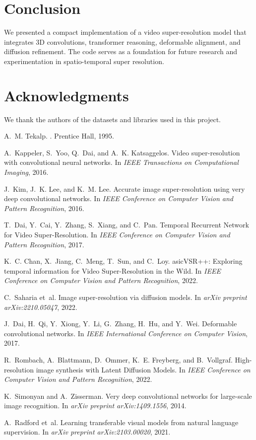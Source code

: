 \documentclass{article}
\begin{document}
\section{Conclusion}
We presented a compact implementation of a video super-resolution model that integrates 3D convolutions, transformer reasoning, deformable alignment, and diffusion refinement. The code serves as a foundation for future research and experimentation in spatio-temporal super resolution.

\section*{Acknowledgments}
We thank the authors of the datasets and libraries used in this project.

\begin{thebibliography}{9}
A.~M. Tekalp.
.
\newblock Prentice Hall, 1995.

A.~Kappeler, S.~Yoo, Q.~Dai, and A.~K. Katsaggelos.
\newblock Video super-resolution with convolutional neural networks.
\newblock In {\em IEEE Transactions on Computational Imaging}, 2016.

J.~Kim, J.~K. Lee, and K.~M. Lee.
\newblock Accurate image super-resolution using very deep convolutional networks.
\newblock In {\em IEEE Conference on Computer Vision and Pattern Recognition}, 2016.

T.~Dai, Y.~Cai, Y.~Zhang, S.~Xiang, and C.~Pan.
\newblock Temporal {R}ecurrent {N}etwork for {V}ideo {S}uper-{R}esolution.
\newblock In {\em IEEE Conference on Computer Vision and Pattern Recognition}, 2017.

K.~C. Chan, X.~Jiang, C.~Meng, T.~Sun, and C.~Loy.
asic{VSR}++: {E}xploring temporal information for {V}ideo {S}uper-{R}esolution in the {W}ild.
\newblock In {\em IEEE Conference on Computer Vision and Pattern Recognition}, 2022.

C.~Saharia et~al.
\newblock Image super-resolution via diffusion models.
\newblock In {\em arXiv preprint arXiv:2210.05047}, 2022.

J.~Dai, H.~Qi, Y.~Xiong, Y.~Li, G.~Zhang, H.~Hu, and Y.~Wei.
\newblock Deformable convolutional networks.
\newblock In {\em IEEE International Conference on Computer Vision}, 2017.

R.~Rombach, A.~Blattmann, D.~Ommer, K.~E. Freyberg, and B.~Vollgraf.
\newblock High-resolution image synthesis with Latent Diffusion Models.
\newblock In {\em IEEE Conference on Computer Vision and Pattern Recognition}, 2022.

K.~Simonyan and A.~Zisserman.
\newblock Very deep convolutional networks for large-scale image recognition.
\newblock In {\em arXiv preprint arXiv:1409.1556}, 2014.

A.~Radford et~al.
\newblock Learning transferable visual models from natural language supervision.
\newblock In {\em arXiv preprint arXiv:2103.00020}, 2021.
\end{thebibliography}
\end{document}
